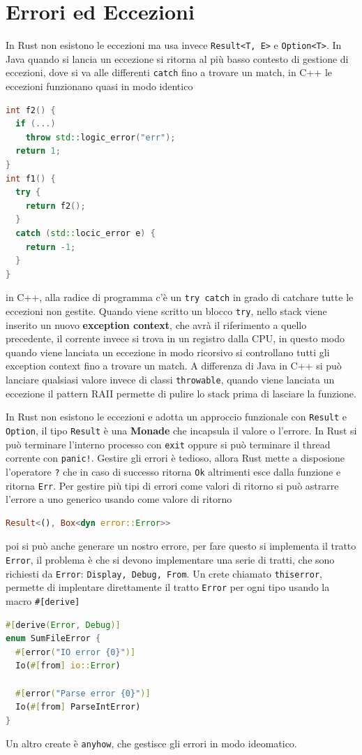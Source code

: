 \documentclass[12pt]{article}
\begin{document}
\section{Errori ed Eccezioni}
In Rust non esistono le eccezioni ma usa invece \texttt{Result<T, E>} e \texttt{Option<T>}. In Java quando si lancia un eccezione si ritorna al pi\`u basso contesto di gestione di eccezioni, dove si va alle differenti \texttt{catch} fino a trovare un match, in C++ le eccezioni funzionano quasi in modo identico
\begin{lstlisting}[language=c++]
int f2() {
  if (...)
    throw std::logic_error("err");
  return 1;
}
int f1() {
  try {
    return f2();
  }
  catch (std::locic_error e) {
    return -1;
  }
}
\end{lstlisting}
in C++, alla radice di programma c'\`e un \texttt{try catch} in grado di catchare tutte le eccezioni non gestite. Quando viene scritto un blocco \texttt{try}, nello stack viene inserito un nuovo \textbf{exception context}, che avr\`a il riferimento a quello precedente, il corrente invece si trova in un registro dalla CPU, in questo modo quando viene lanciata un eccezione in modo ricorsivo si controllano tutti gli exception context fino a trovare un match. A differenza di Java in C++ si pu\`o lanciare qualsiasi valore invece di classi \texttt{throwable}, quando viene lanciata un eccezione il pattern RAII permette di pulire lo stack prima di lasciare la funzione.

In Rust non esistono le eccezioni e adotta un approccio funzionale con \texttt{Result} e \texttt{Option}, il tipo \texttt{Result} 
\`e una \textbf{Monade} che incapsula il valore o l'errore. In Rust si pu\`o terminare l'interno processo con \texttt{exit} oppure si pu\`o terminare il thread corrente con \texttt{panic!}. Gestire gli errori \`e tedioso, allora Rust mette a disposione l'operatore \texttt{?} che in caso di successo ritorna \texttt{Ok} altrimenti esce dalla funzione e ritorna \texttt{Err}. Per gestire pi\`u tipi di errori come valori di ritorno si pu\`o astrarre l'errore a uno generico usando come valore di ritorno
\begin{lstlisting}[language=rust]
Result<(), Box<dyn error::Error>>
\end{lstlisting}
poi si pu\`o anche generare un nostro errore, per fare questo si implementa il tratto \texttt{Error}, il problema \`e che si devono implementare una serie di tratti, che sono richiesti da \texttt{Error}: \texttt{Display, Debug, From}. Un crete chiamato \texttt{thiserror}, permette di implentare direttamente il tratto \texttt{Error} per ogni tipo usando la macro \texttt{\#[derive]}
\begin{lstlisting}[language=rust]
#[derive(Error, Debug)]
enum SumFileError {
  #[error("IO error {0}")]
  Io(#[from] io::Error)

  #[error("Parse error {0}")]
  Io(#[from] ParseIntError)
}
\end{lstlisting}
Un altro create \`e \texttt{anyhow}, che gestisce gli errori in modo ideomatico.
\end{document}
